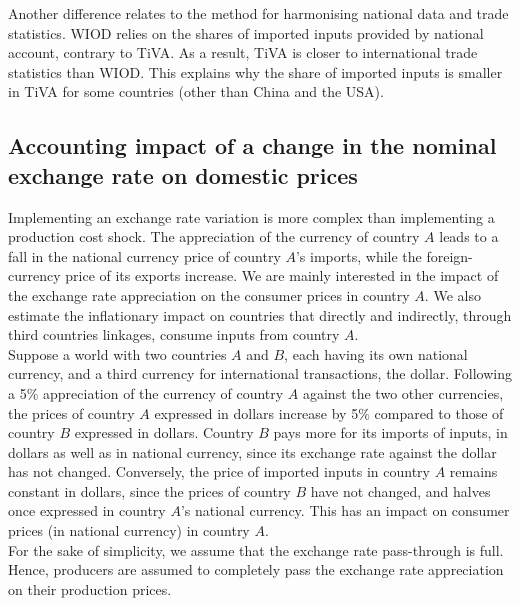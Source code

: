 \documentclass[12pt,a4paper]{paper}
\begin{document}
Another difference relates to the method for harmonising national data and trade statistics. WIOD relies on the shares of imported inputs provided by national account, contrary to TiVA. As a result, TiVA is closer to international trade statistics than WIOD. This explains why the share of imported inputs is smaller in TiVA for some countries (other than China and the USA).

\subsection{Accounting impact of a change in the nominal exchange rate on domestic prices} \label{subsec:chocchange}

Implementing an exchange rate variation is more complex than implementing a production cost shock. 
The appreciation of the currency of country $A$ leads to a fall in the national currency price of country $A$'s imports, while the foreign-currency price of its exports increase. 
We are mainly interested in the impact of the exchange rate appreciation on the consumer prices in country $A$. 
We also estimate the inflationary impact on countries that directly and indirectly, through third countries linkages, consume inputs from country $A$.\\
Suppose a world with two countries $A$ and $B$, each having its own national currency, and a third currency for international transactions, the dollar.
Following a 5$\%$ appreciation of the currency of country $A$ against the two other currencies, the prices of country $A$ expressed in dollars increase by 5$\%$ compared to those of country $B$ expressed in dollars. 
Country $B$ pays more for its imports of inputs, in dollars as well as in national currency, since its exchange rate against the dollar has not changed. 
Conversely, the price of imported inputs in country $A$ remains constant in dollars, since the prices of country $B$ have not changed, and halves once expressed in country $A$'s national currency. 
This has an impact on consumer prices (in national currency) in country $A$.\\
For the sake of simplicity, we assume that the exchange rate pass-through is full. Hence, producers are assumed to completely pass the exchange rate appreciation on their production prices. 
\end{document}
